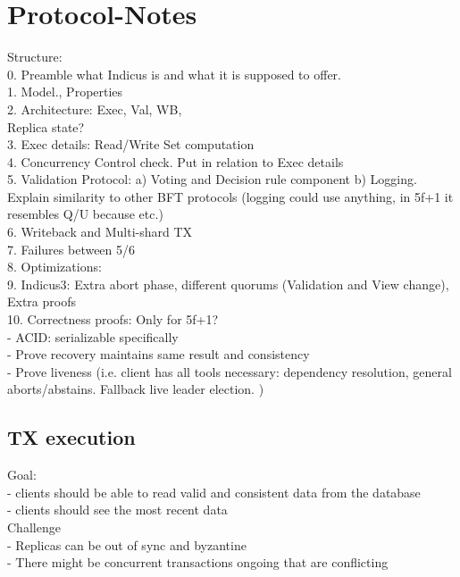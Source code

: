 \section{Protocol-Notes}

Structure:\\
0. Preamble what Indicus is and what it is supposed to offer.\\
1. Model., Properties   \\
2. Architecture: Exec, Val, WB, \\

Replica state?\\

3. Exec details: Read/Write Set computation\\
4. Concurrency Control check. Put in relation to Exec details\\
5. Validation Protocol: a) Voting and Decision rule component b) Logging. Explain similarity to other BFT protocols (logging could use anything, in 5f+1 it resembles Q/U because etc.)\\
6. Writeback and Multi-shard TX\\
7. Failures between 5/6\\
8. Optimizations: \\
9. Indicus3: Extra abort phase, different quorums (Validation and View change), Extra proofs\\
10. Correctness proofs: Only for 5f+1?\\
	- ACID: serializable specifically\\
	- Prove recovery maintains same result and consistency\\
	- Prove liveness (i.e. client has all tools necessary: dependency resolution, general aborts/abstains. Fallback live leader election. )\\

\subsection{TX execution}
Goal:\\
- clients should be able to read valid and consistent data from the database\\
- clients should see the most recent data\\


Challenge\\
- Replicas can be out of sync and byzantine\\
- There might be concurrent transactions ongoing that are conflicting\\

